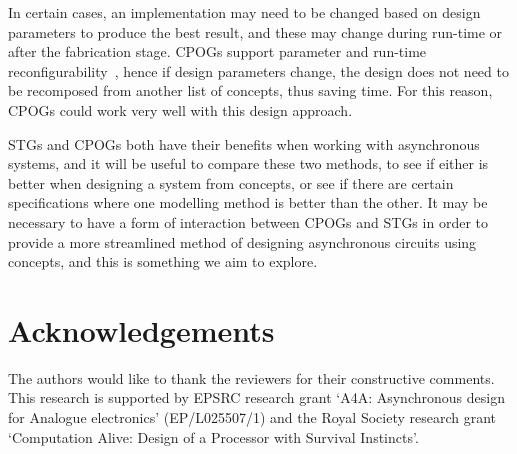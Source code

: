 \documentclass[british,compsoc]{IEEEtran}
\newcommand{\noun}[1]{\textsc{#1}}
\begin{document}
In certain cases, an implementation may need to be changed based on
design parameters to produce the best result, and these may change
during run-time or after the fabrication stage. CPOGs support parameter
and run-time reconfigurability~\cite{microadapt}, hence if
design parameters change, the design does not need to be recomposed
from another list of concepts, thus saving time. For this reason,
CPOGs could work very well with this design approach.

STGs and CPOGs both have their benefits when working with asynchronous
systems, and it will be useful to compare these two methods, to see
if either is better when designing a system from concepts, or see
if there are certain specifications where one modelling method is
better than the other. It may be necessary to have a form of interaction between CPOGs and STGs in order to provide a more streamlined method of designing asynchronous circuits
using concepts, and this is something we aim to explore.


%
%
%


\section*{Acknowledgements}


The authors would like to thank the reviewers for their constructive
comments. This research is supported by EPSRC research grant `A4A:
Asynchronous design for Analogue electronics' (EP/L025507/1) and
the Royal Society research grant `Computation Alive: Design of a
Processor with Survival Instincts'.




\end{document}
